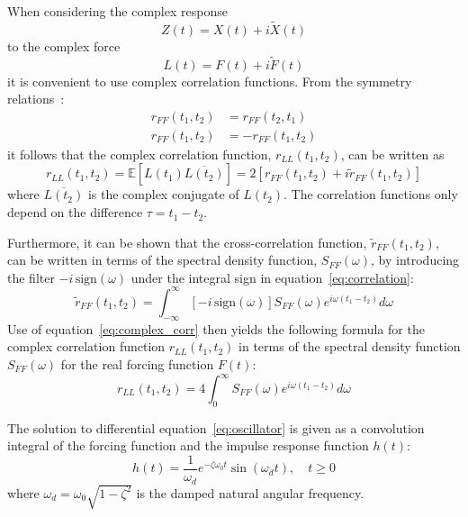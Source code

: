\documentclass[12pt]{article}
\begin{document}
When considering the complex response
\begin{equation}
    Z(t) = X(t) + i \tilde{X}(t)
    \label{eq:complex_response}
\end{equation}
to the complex force
\begin{equation}
    L(t) = F(t) + i \tilde{F}(t)
    \label{eq:complex_force}
\end{equation}
it is convenient to use complex correlation functions. From the symmetry relations~\cite{papoulis1965}:
\begin{align}
    r_{FF}(t_1, t_2) &= r_{FF}(t_2, t_1) \label{eq:sym1} \\
    r_{FF}(t_1, t_2) &= -r_{FF}(t_1, t_2) \label{eq:sym2}
\end{align}
it follows that the complex correlation function, $r_{LL}(t_1, t_2)$, can be written as
\begin{equation}
    r_{LL}(t_1, t_2) = \mathbb{E}[L(t_1) \overline{L(t_2)}] = 2 \left[ r_{FF}(t_1, t_2) + i \tilde{r}_{FF}(t_1, t_2) \right]
    \label{eq:complex_corr}
\end{equation}
where $\overline{L(t_2)}$ is the complex conjugate of $L(t_2)$. The correlation functions only depend on the difference $\tau = t_1 - t_2$.

Furthermore, it can be shown that the cross-correlation function, $\tilde{r}_{FF}(t_1, t_2)$, can be written in terms of the spectral density function, $S_{FF}(\omega)$, by introducing the filter $-i\,\text{sign}(\omega)$ under the integral sign in equation~\eqref{eq:correlation}:
\begin{equation}
    \tilde{r}_{FF}(t_1, t_2) = \int_{-\infty}^{\infty} [-i\,\text{sign}(\omega)] S_{FF}(\omega) e^{i\omega(t_1 - t_2)} d\omega
    \label{eq:hilbert_corr}
\end{equation}
Use of equation~\eqref{eq:complex_corr} then yields the following formula for the complex correlation function $r_{LL}(t_1, t_2)$ in terms of the spectral density function $S_{FF}(\omega)$ for the real forcing function $F(t)$:
\begin{equation}
    r_{LL}(t_1, t_2) = 4 \int_0^{\infty} S_{FF}(\omega) e^{i\omega(t_1 - t_2)} d\omega
    \label{eq:complex_corr_sff}
\end{equation}

The solution to differential equation~\eqref{eq:oscillator} is given as a convolution integral of the forcing function and the impulse response function $h(t)$:
\begin{equation}
    h(t) = \frac{1}{\omega_d} e^{-\zeta \omega_0 t} \sin(\omega_d t), \quad t \geq 0
    \label{eq:impulse_response}
\end{equation}
where $\omega_d = \omega_0 \sqrt{1 - \zeta^2}$ is the damped natural angular frequency.
\end{document}
